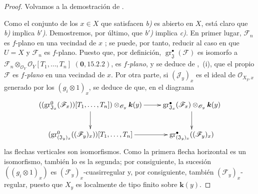 \begin{proof}
Volvamos a la demostración de .

Como el conjunto de los $x\in X$ que satisfacen \emph{b)} es abierto en $X$, está claro que \emph{b)} implica \emph{b$'$)}. Demostremos, por último, que \emph{b$'$)} implica \emph{c)}. En primer lugar, $\mathcal F_n$ es $f$-plano en una vecindad de $x$ ; se puede, por tanto, reducir al caso en que $U=X$ y $\mathcal F_n$ es $f$-plano. Puesto que, por definición, $\operatorname{gr}_{\mathfrak J}^\bullet(\mathcal F)$ es isomorfo a $\mathcal F_n\otimes_{\mathcal O_Y}\mathcal O_Y[T_1,\ldots,T_n]$ $(\mathbf 0,15.2.2)$, es \emph{$f$-plano}, y se deduce de ,~(i), que el propio $\mathcal F$ es \emph{$f$-plano} en una vecindad de $x$. Por otra parte, si $(\mathcal J_y)_x$ es el ideal de $\mathcal O_{X_y,x}$ generado por los $(g_i\otimes1)_x$, se deduce de  que, en el diagrama
\[
\xymatrix{
((\operatorname{gr}_{\mathfrak J_x}^0(\mathcal F_x))[T_1,\ldots,T_n])
 \otimes_{\mathcal O_y}\boldsymbol{k}(y) \ar[r] \ar[d] &
\operatorname{gr}_{\mathfrak J_x}^\bullet(\mathcal F_x)
 \otimes_{\mathcal O_y}\boldsymbol{k}(y) \ar[d] \\
(\operatorname{gr}_{(\mathfrak J_y)_x}^0((\mathcal F_y)_x))
 [T_1,\ldots,T_n] \ar[r] &
\operatorname{gr}_{(\mathfrak J_y)_x}^\bullet((\mathcal F_y)_x)
}
\]
las flechas verticales son isomorfismos. Como la primera flecha horizontal es un isomorfismo, también lo es la segunda; por consiguiente, la sucesión $((g_i\otimes1)_x)$ es $(\mathcal F_y)_x$-cuasirregular y, por consiguiente, también $(\mathcal F_y)_x$-regular, puesto que $X_y$ es localmente de tipo finito sobre $\boldsymbol{k}(y)$.
\end{proof}

